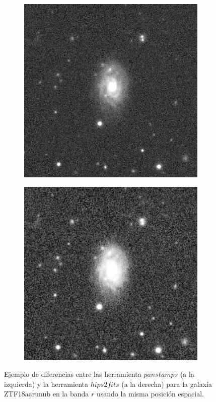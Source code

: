 \documentclass[../tesis.tex]{subfiles}
\begin{document}
\begin{figure}[h]
\centering
\begin{subfigure}{.5\textwidth}
  \centering
  \includegraphics[width=0.89\linewidth]{images/ZTF18aarunub_panstamps_r.jpeg}
  \label{fig:ZTF18aarunub_panstamps_r}
\end{subfigure}%
\begin{subfigure}{.5\textwidth}
  \centering
  \includegraphics[width=0.9\linewidth]{images/ZTF18aarunub_hips2fits_r.jpg}
  \label{fig:ZTF18aarunub_hips2fits_r}
\end{subfigure}
\caption{Ejemplo de diferencias entre las herramienta $panstamps$ (a la izquierda) y la herramienta $hips2fits$ (a la derecha) para la galaxía ZTF18aarunub en la banda $r$ usando la misma posición espacial.}
\label{fig:test}
\end{figure}
\end{document}
